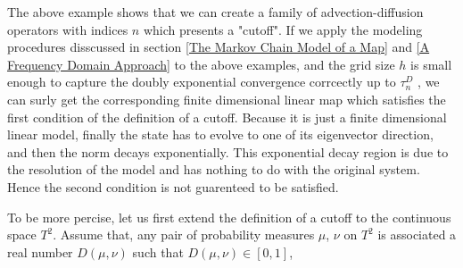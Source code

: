 \documentclass{article}
\begin{document}

The above example shows that we can create a family of advection-diffusion operators with indices $n$ which presents a
"cutoff". If we apply the modeling procedures disscussed in section \ref{The Markov Chain Model of a Map} and \ref{A Frequency Domain Approach} to the above examples, and the grid size $h$ is small enough to capture the doubly exponential convergence corrcectly up to $\tau^D_n$ , we can surly get the corresponding finite dimensional linear map which satisfies the first condition of the definition of a cutoff. Because it is just a finite dimensional linear model, finally the state has to evolve to one of its eigenvector direction, and then the norm decays exponentially. This exponential decay region is due to the resolution of the model and has nothing to do with the original system. Hence the second condition is not guarenteed to be satisfied. 







To be more percise, let us first extend the definition of a cutoff to the continuous space $T^2$. Assume that, any
pair of probability measures $\mu$, $\nu$ on $T^2$ is associated
a real number $D(\mu,\nu)$ such that $D(\mu,\nu)\in [0,1]$,
\end{document}
